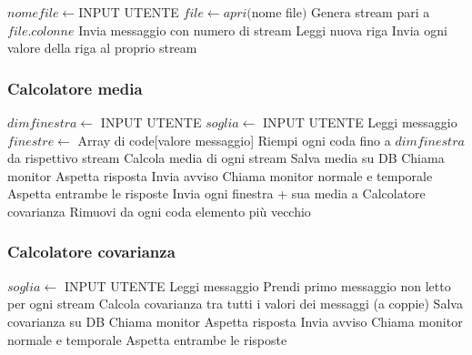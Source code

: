 \documentclass{article}
\begin{document}
\begin{algorithmic}
	\State $nome file \gets $INPUT UTENTE
	\State $file \gets apri($nome file$)$
	\State Genera stream pari a $file.colonne$
	\State Invia messaggio con numero di stream
	\State Leggi nuova riga
	\State Invia ogni valore della riga al proprio stream
	\EndWhile
\end{algorithmic}

\subsubsection{Calcolatore media}
\begin{algorithmic}
	\State $dimfinestra \gets $ INPUT UTENTE
	\State $soglia \gets$ INPUT UTENTE
	\State Leggi messaggio
	\State $finestre \gets $ Array di code[valore messaggio]
	\State Riempi ogni coda fino a $dimfinestra$ da rispettivo stream
	\State Calcola media di ogni stream
            \State Salva media su DB
	      \State Chiama monitor
	      \State Aspetta risposta
            	\State Invia avviso
            	\State Chiama monitor normale e temporale
            	\State Aspetta entrambe le risposte
        	\EndIf
    \EndFor
	\State Invia ogni finestra + sua media a Calcolatore covarianza
	\State Rimuovi da ogni coda elemento più vecchio
	\EndWhile
\end{algorithmic}
\vspace{4pt}

\subsubsection{Calcolatore covarianza}

\begin{algorithmic}
	\State $soglia \gets$ INPUT UTENTE
	\State Leggi messaggio
	\State Prendi primo messaggio non letto per ogni stream
	\State Calcola covarianza tra tutti i valori dei messaggi (a coppie)
	   \State Salva covarianza su DB
	   \State Chiama monitor
	   \State Aspetta risposta
	       \State Invia avviso
	       \State Chiama monitor normale e temporale
	       \State Aspetta entrambe le risposte
	   \EndIf
    \EndFor
	\EndWhile
\end{algorithmic}
\end{document}

